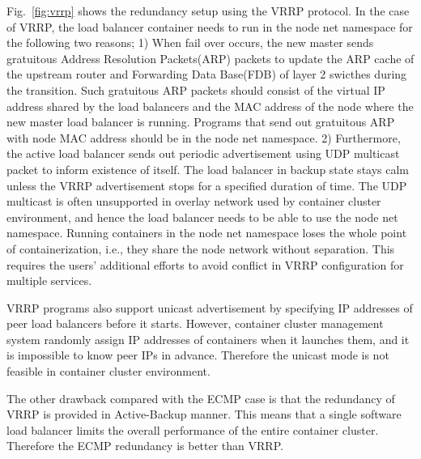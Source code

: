 Fig.~\ref{fig:vrrp} shows the redundancy setup using the VRRP protocol.
In the case of VRRP, the load balancer container needs to run in the node net namespace for the following two reasons;
1) When fail over occurs, the new master sends gratuitous Address Resolution Packets(ARP) packets to update the ARP cache of the upstream router and Forwarding Data Base(FDB) of layer 2 swicthes during the transition.
Such gratuitous ARP packets should consist of the virtual IP address shared by the load balancers and the MAC address of the node where the new master load balancer is running.
Programs that send out gratuitous ARP with node MAC address should be in the node net namespace.
%
2) Furthermore, the active load balancer sends out periodic advertisement using UDP multicast packet to inform existence of itself.
The load balancer in backup state stays calm unless the VRRP advertisement stops for a specified duration of time.
The UDP multicast is often unsupported in overlay network used by container cluster environment, and hence the load balancer needs to be able to use the node net namespace.
%
Running containers in the node net namespace loses the whole point of containerization, i.e., they share the node network without separation.
This requires the users' additional efforts to avoid conflict in VRRP configuration for multiple services.
%

VRRP programs also support unicast advertisement by specifying IP addresses of peer load balancers before it starts.
However, container cluster management system randomly assign IP addresses of containers when it launches them, and it is impossible to know peer IPs in advance. 
Therefore the unicast mode is not feasible in container cluster environment.

The other drawback compared with the ECMP case is that the redundancy of VRRP is provided in Active-Backup manner.
This means that a single software load balancer limits the overall performance of the entire container cluster.
Therefore the ECMP redundancy is better than VRRP.



